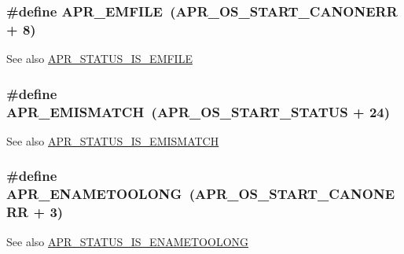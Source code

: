 \subsubsection[{\texorpdfstring{A\+P\+R\+\_\+\+E\+M\+F\+I\+LE}{APR_EMFILE}}]{\setlength{\rightskip}{0pt plus 5cm}\#define A\+P\+R\+\_\+\+E\+M\+F\+I\+LE~({\bf A\+P\+R\+\_\+\+O\+S\+\_\+\+S\+T\+A\+R\+T\+\_\+\+C\+A\+N\+O\+N\+E\+RR} + 8)}\hypertarget{group___a_p_r___error_gaec391eaf0bfa6aed03457ed3f796942d}{}\label{group___a_p_r___error_gaec391eaf0bfa6aed03457ed3f796942d}
\begin{DoxySeeAlso}{See also}
\hyperlink{group___a_p_r___s_t_a_t_u_s___i_s_ga9d8408068278a2a5f9409a3262bf39bf}{A\+P\+R\+\_\+\+S\+T\+A\+T\+U\+S\+\_\+\+I\+S\+\_\+\+E\+M\+F\+I\+LE} 
\end{DoxySeeAlso}
\subsubsection[{\texorpdfstring{A\+P\+R\+\_\+\+E\+M\+I\+S\+M\+A\+T\+CH}{APR_EMISMATCH}}]{\setlength{\rightskip}{0pt plus 5cm}\#define A\+P\+R\+\_\+\+E\+M\+I\+S\+M\+A\+T\+CH~({\bf A\+P\+R\+\_\+\+O\+S\+\_\+\+S\+T\+A\+R\+T\+\_\+\+S\+T\+A\+T\+US} + 24)}\hypertarget{group___a_p_r___error_ga31e65a44daba96aa6d943529e94498e7}{}\label{group___a_p_r___error_ga31e65a44daba96aa6d943529e94498e7}
\begin{DoxySeeAlso}{See also}
\hyperlink{group___a_p_r___s_t_a_t_u_s___i_s_ga87a446df78fd35f2192e14142f6398c4}{A\+P\+R\+\_\+\+S\+T\+A\+T\+U\+S\+\_\+\+I\+S\+\_\+\+E\+M\+I\+S\+M\+A\+T\+CH} 
\end{DoxySeeAlso}
\subsubsection[{\texorpdfstring{A\+P\+R\+\_\+\+E\+N\+A\+M\+E\+T\+O\+O\+L\+O\+NG}{APR_ENAMETOOLONG}}]{\setlength{\rightskip}{0pt plus 5cm}\#define A\+P\+R\+\_\+\+E\+N\+A\+M\+E\+T\+O\+O\+L\+O\+NG~({\bf A\+P\+R\+\_\+\+O\+S\+\_\+\+S\+T\+A\+R\+T\+\_\+\+C\+A\+N\+O\+N\+E\+RR} + 3)}\hypertarget{group___a_p_r___error_ga3db63b16c2b332efe441e2661f593377}{}\label{group___a_p_r___error_ga3db63b16c2b332efe441e2661f593377}
\begin{DoxySeeAlso}{See also}
\hyperlink{group___a_p_r___s_t_a_t_u_s___i_s_ga262037995fb0be630f8dc792452063d5}{A\+P\+R\+\_\+\+S\+T\+A\+T\+U\+S\+\_\+\+I\+S\+\_\+\+E\+N\+A\+M\+E\+T\+O\+O\+L\+O\+NG} 
\end{DoxySeeAlso}
